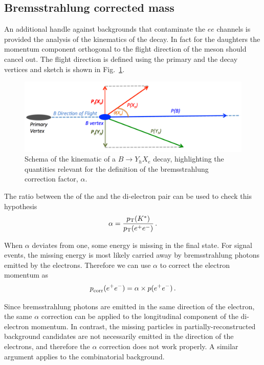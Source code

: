 
\subsection{Bremsstrahlung corrected mass}
\label{sec:HOP}

An additional handle against backgrounds that contaminate the $ee$ channels is provided the analysis of the kinematics of the decay.
In fact for the \Bz daughters the momentum component orthogonal to the flight direction of the \Bz meson should cancel out.
The flight direction is defined using the primary and the decay vertices and sketch is shown in Fig.~\ref{fig:schemaHOP}. 
\begin{figure}[tb]
  \begin{center}
    \includegraphics[width=0.9\linewidth]{RKst/figs/HOP/schemaHOP.pdf}
    \vspace*{-1.0cm}
  \end{center}
  \caption{ Schema of the kinematic of a $B \to Y_h X_e$ decay, highlighting the quantities relevant for the 
  definition of the bremsstrahlung correction factor, $\alpha$.}
  \label{fig:schemaHOP}
\end{figure}

The ratio between the \pt of the \Kstarz and the di-electron pair can be used to check this hypothesis
%
$$\alpha = \frac{\mbox{$p_{\rm T}$}({{K}^*})}{\mbox{$p_{\rm T}$}(e^+ e^-)} \, .$$

When $\alpha$ deviates from one, some energy is missing in the final state. 
For signal events, the missing energy is most likely carried away by bremsstrahlung photons emitted
by the electrons. Therefore we can use $\alpha$ to correct the electron momentum as
%
$$\mbox{$p$}_{\textrm{corr}}(e^+ e^-) = \alpha \times \mbox{$p$}(e^+ e^-) \, .$$

Since bremsstrahlung photons are emitted in the same direction of the electron, the same $\alpha$ correction can
be applied to the longitudinal component of the di-electron momentum.
In contrast, the missing particles in partially-reconstructed background candidates are not necessarily emitted in the
direction of the electrons, and therefore the $\alpha$ correction does not work properly.
A similar argument applies to the combinatorial background. 

